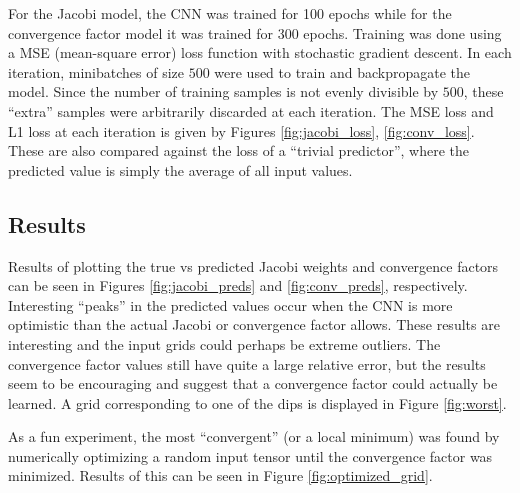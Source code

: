 For the Jacobi model, the CNN was trained for 100 epochs while for the convergence factor model it was trained for 300 epochs.  Training was done using a MSE (mean-square error) loss function with stochastic gradient descent.  In each iteration, minibatches of size $500$ were used to train and backpropagate the model.  Since the number of training samples is not evenly divisible by $500$, these ``extra'' samples were arbitrarily discarded at each iteration.  The MSE loss and L1 loss at each iteration is given by Figures \ref{fig:jacobi_loss}, \ref{fig:conv_loss}.  These are also compared against the loss of a ``trivial predictor'', where the predicted value is simply the average of all input values.

\subsection{Results}

Results of plotting the true vs predicted Jacobi weights and convergence factors can be seen in Figures \ref{fig:jacobi_preds} and \ref{fig:conv_preds}, respectively.  Interesting ``peaks'' in the predicted values occur when the CNN is more optimistic than the actual Jacobi or convergence factor allows.  These results are interesting and the input grids could perhaps be extreme outliers.  The convergence factor values still have quite a large relative error, but the results seem to be encouraging and suggest that a convergence factor could actually be learned.  A grid corresponding to one of the dips is displayed in Figure \ref{fig:worst}.

As a fun experiment, the most ``convergent'' (or a local minimum) was found by numerically optimizing a random input tensor until the convergence factor was minimized.  Results of this can be seen in Figure \ref{fig:optimized_grid}.

